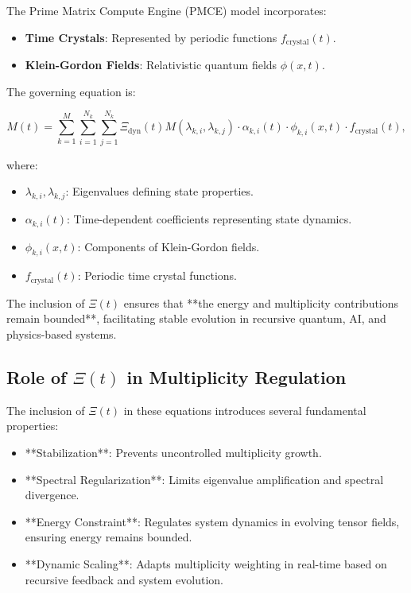 \documentclass{article}
\theoremstyle{plain}
\begin{document}
\begin{itemize}
The Prime Matrix Compute Engine (PMCE) model incorporates:

\begin{itemize}
    \item \textbf{Time Crystals}: Represented by periodic functions \( f_{\text{crystal}}(t) \).
    \item \textbf{Klein-Gordon Fields}: Relativistic quantum fields \( \phi(x, t) \).
\end{itemize}

The governing equation is:

\begin{equation}
M(t) = \sum_{k=1}^M \sum_{i=1}^{N_k} \sum_{j=1}^{N_k} \Xi_{\text{dyn}}(t) M(\lambda_{k,i}, \lambda_{k,j}) \cdot \alpha_{k,i}(t) \cdot \phi_{k,i}(x,t) \cdot f_{\text{crystal}}(t),
\end{equation}

where:

\begin{itemize}
    \item \( \lambda_{k,i}, \lambda_{k,j} \): Eigenvalues defining state properties.
    \item \( \alpha_{k,i}(t) \): Time-dependent coefficients representing state dynamics.
    \item \( \phi_{k,i}(x,t) \): Components of Klein-Gordon fields.
    \item \( f_{\text{crystal}}(t) \): Periodic time crystal functions.
\end{itemize}

The inclusion of \(\Xi(t) \) ensures that **the energy and multiplicity contributions remain bounded**, facilitating stable evolution in recursive quantum, AI, and physics-based systems.

\subsection{Role of \(\Xi(t) \) in Multiplicity Regulation}

The inclusion of \(\Xi(t) \) in these equations introduces several fundamental properties:

\begin{itemize}
    \item **Stabilization**: Prevents uncontrolled multiplicity growth.
    \item **Spectral Regularization**: Limits eigenvalue amplification and spectral divergence.
    \item **Energy Constraint**: Regulates system dynamics in evolving tensor fields, ensuring energy remains bounded.
    \item **Dynamic Scaling**: Adapts multiplicity weighting in real-time based on recursive feedback and system evolution.
\end{itemize}


\end{itemize}
\end{document}

